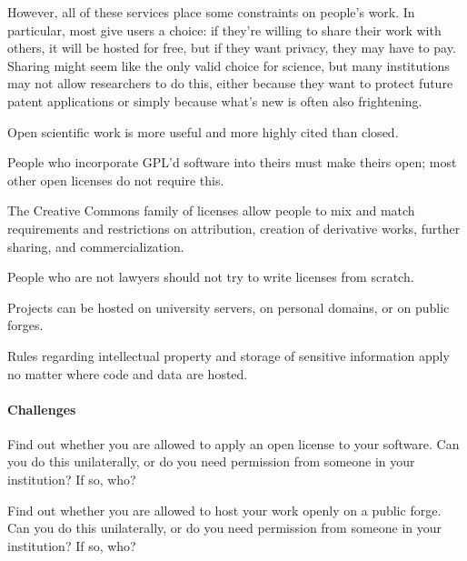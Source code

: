\documentclass{book}
\begin{document}
However, all of these services place some constraints on people's work.
In particular, most give users a choice: if they're willing to share
their work with others, it will be hosted for free, but if they want
privacy, they may have to pay. Sharing might seem like the only valid
choice for science, but many institutions may not allow researchers to
do this, either because they want to protect future patent applications
or simply because what's new is often also frightening.

\begin{keypoints}
\begin{swcitemize}
\item
  Open scientific work is more useful and more highly cited than closed.
\item
  People who incorporate GPL'd software into theirs must make theirs
  open; most other open licenses do not require this.
\item
  The Creative Commons family of licenses allow people to mix and match
  requirements and restrictions on attribution, creation of derivative
  works, further sharing, and commercialization.
\item
  People who are not lawyers should not try to write licenses from
  scratch.
\item
  Projects can be hosted on university servers, on personal domains, or
  on public forges.
\item
  Rules regarding intellectual property and storage of sensitive
  information apply no matter where code and data are hosted.
\end{swcitemize}
\end{keypoints}

\mbox{}\paragraph{Challenges}

\begin{swcenumerate}
\item
  Find out whether you are allowed to apply an open license to your
  software. Can you do this unilaterally, or do you need permission from
  someone in your institution? If so, who?
\item
  Find out whether you are allowed to host your work openly on a public
  forge. Can you do this unilaterally, or do you need permission from
  someone in your institution? If so, who?
\end{swcenumerate}
\end{document}
